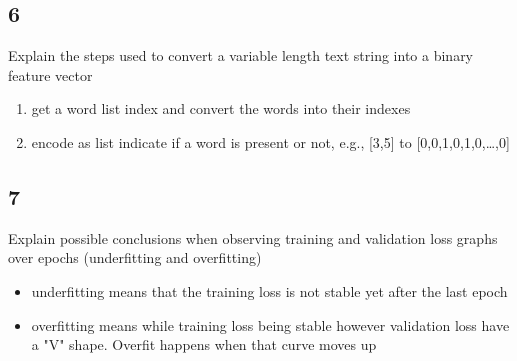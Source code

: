 \documentclass{article}
\begin{document}
\subsection*{6}
\begin{myleftlinebox}
    Explain the steps used to convert a variable length text string into a binary feature vector
    \tcblower
    \begin{enumerate}
        \item get a word list index and convert the words into their indexes
        \item encode as list indicate if a word is present or not, e.g., [3,5] to [0,0,1,0,1,0,…,0]
    \end{enumerate}
\end{myleftlinebox}

\subsection*{7}
\begin{myleftlinebox}
    Explain possible conclusions when observing training and validation loss graphs over epochs (underfitting and overfitting) 
    \tcblower
    \begin{itemize}
        \item underfitting means that the training loss is not stable yet after the last epoch
        \item overfitting means while training loss being stable however validation loss have a "V" shape. Overfit happens when that curve moves up
    \end{itemize}
\end{myleftlinebox}
\end{document}
